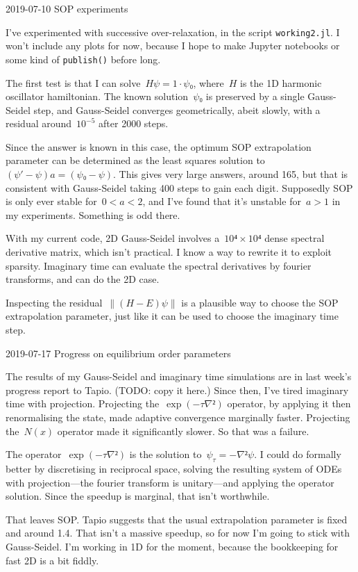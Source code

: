 2019-07-10 SOP experiments

I've experimented with successive over-relaxation, in the script {\tt working2.jl}.  I won't include any plots for now, because I hope to make Jupyter notebooks or some kind of {\tt publish()} before long.

The first test is that I can solve~$Hψ=1·ψ₀$, where~$H$ is the 1D harmonic oscillator hamiltonian.  The known solution~$ψ₀$ is preserved by a single Gauss-Seidel step, and Gauss-Seidel converges geometrically, abeit slowly, with a residual around~$10^{-5}$ after 2000 steps.

Since the answer is known in this case, the optimum SOP extrapolation parameter can be determined as the least squares solution to~$(ψ'-ψ)a=(ψ₀-ψ)$.  This gives very large answers, around 165, but that is consistent with Gauss-Seidel taking 400 steps to gain each digit.  Supposedly SOP is only ever stable for~$0<a<2$, and I've found that it's unstable for~$a>1$ in my experiments.  Something is odd there.

With my current code, 2D Gauss-Seidel involves a~$10⁴×10⁴$ dense spectral derivative matrix, which isn't practical.  I know a way to rewrite it to exploit sparsity.  Imaginary time can evaluate the spectral derivatives by fourier transforms, and can do the 2D case.

Inspecting the residual~$∥(H-E)ψ∥$ is a plausible way to choose the SOP extrapolation parameter, just like it can be used to choose the imaginary time step.

2019-07-17 Progress on equilibrium order parameters

The results of my Gauss-Seidel and imaginary time simulations are in last week's progress report to Tapio.  (TODO: copy it here.)  Since then, I've tired imaginary time with projection.  Projecting the~$\exp(-τ∇²)$ operator, by applying it then renormalising the state, made adaptive convergence marginally faster.  Projecting the~$N(x)$ operator made it significantly slower.  So that was a failure.

The operator~$\exp(-τ∇²)$ is the solution to~$ψ_τ=-∇²ψ$.  I could do formally better by discretising in reciprocal space, solving the resulting system of ODEs with projection—the fourier transform is unitary—and applying the operator solution.  Since the speedup is marginal, that isn't worthwhile.

That leaves SOP.  Tapio suggests that the usual extrapolation parameter is fixed and around 1.4.  That isn't a massive speedup, so for now I'm going to stick with Gauss-Seidel.  I'm working in 1D for the moment, because the bookkeeping for fast 2D is a bit fiddly.

